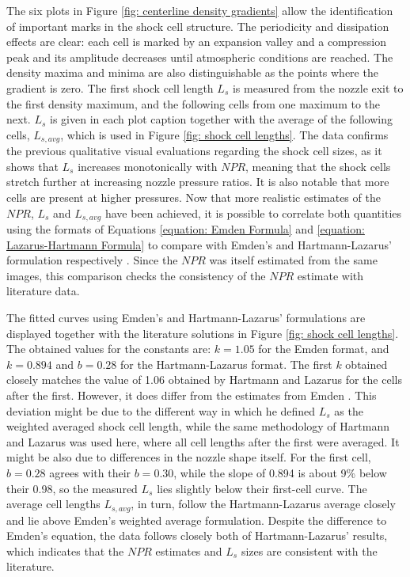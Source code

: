 The six plots in Figure \ref{fig: centerline density gradients} allow the identification of important marks in the shock cell structure. The periodicity and dissipation effects are clear: each cell is marked by an expansion valley and a compression peak and its amplitude decreases until atmospheric conditions are reached. The density maxima and minima are also distinguishable as the points where the gradient is zero. The first shock cell length $L_s$ is measured from the nozzle exit to the first density maximum, and the following cells from one maximum to the next. $L_s$ is given in each plot caption together with the average of the following cells, $L_{s,avg}$, which is used in Figure \ref{fig: shock cell lengths}. The data confirms the previous qualitative visual evaluations regarding the shock cell sizes, as it shows that $L_s$ increases monotonically with $NPR$, meaning that the shock cells stretch further at increasing nozzle pressure ratios. It is also notable that more cells are present at higher pressures. Now that more realistic estimates of the $NPR$, $L_s$ and $L_{s,avg}$ have been achieved, it is possible to correlate both quantities using the formats of Equations \ref{equation: Emden Formula} and \ref{equation: Lazarus-Hartmann Formula} to compare with Emden's and Hartmann-Lazarus' formulation respectively \cite{Powell2010, Emden1899, Hartmann1941}. Since the $NPR$ was itself estimated from the same images, this comparison checks the consistency of the $NPR$ estimate with literature data.


The fitted curves using Emden's and Hartmann-Lazarus' formulations are displayed together with the literature solutions in Figure \ref{fig: shock cell lengths}. The obtained values for the constants are: $k = 1.05$ for the Emden format, and $k = 0.894$ and $b = 0.28$ for the Hartmann-Lazarus format. The first $k$ obtained closely matches the value of 1.06 obtained by Hartmann and Lazarus \cite{Hartmann1941} for the cells after the first. However, it does differ from the estimates from Emden \cite{Emden1899}. This deviation might be due to the different way in which he defined $L_s$ as the weighted averaged shock cell length, while the same methodology of Hartmann and Lazarus was used here, where all cell lengths after the first were averaged. It might be also due to differences in the nozzle shape itself. For the first cell, $b = 0.28$ agrees with their $b = 0.30$, while the slope of 0.894 is about 9\% below their 0.98, so the measured $L_s$ lies slightly below their first-cell curve. The average cell lengths $L_{s,avg}$, in turn, follow the Hartmann-Lazarus average closely and lie above Emden's weighted average formulation. Despite the difference to Emden's equation, the data follows closely both of Hartmann-Lazarus' results, which indicates that the $NPR$ estimates and $L_s$ sizes are consistent with the literature.

